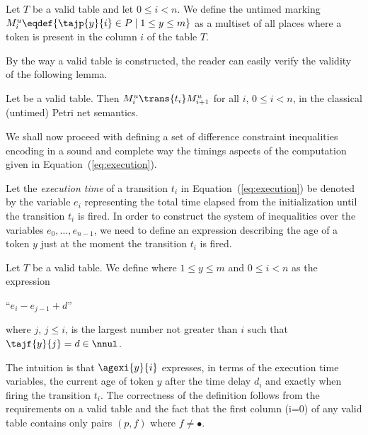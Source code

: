 \begin{definition} \label{def:untmark}
Let $T$ be a valid table and let $0 \leq i < n$.
We define the untimed marking $M_i^u \eqdef \{ \tajp{y}{i} \in P \mid
1 \leq y \leq m  \}$  as a multiset of all places where a token is present
in the column $i$ of the table $T$.
\end{definition}

By the way a valid table is constructed, the reader can easily verify
the validity of the following lemma.
\begin{lemma}\label{lemma:untmarking}
Let  be a valid table.
Then $M^u_i \trans{t_i} M^{u}_{i+1}$ for all $i$, $0 \leq i < n$,
in the classical (untimed) Petri net semantics.
\end{lemma}

We shall now proceed with defining a set of difference constraint 
inequalities encoding in a sound and complete way 
the timings aspects of the computation given in Equation~(\ref{eq:execution}).

Let the \emph{execution time} of a transition $t_i$
in Equation~(\ref{eq:execution}) be denoted by the variable $e_i$
representing the total time elapsed from the 
initialization until the transition $t_{i}$ is fired. 
In order to construct the system of inequalities over the variables
$e_0, \ldots, e_{n-1}$, we need to define an expression describing
the age of a token $y$ just at the moment the transition $t_i$ is fired.

\begin{definition}\label{def:age}
Let $T$ be a valid table.
We define  where $1 \leq y \leq m$ and $0 \leq i < n$
as the expression 
\begin{center}
``$e_i -e_{j-1} +d$'' 
\end{center}
where $j$, $j\leq i$,
is the largest number not greater than $i$
such that $\tajf{y}{j}=d\in \nnul$. 
\end{definition}

The intuition is that $\agexi{y}{i}$ expresses, in terms of
the execution time variables, the current age
of token $y$ after the time delay $d_i$ and exactly when 
firing the transition $t_i$.
The correctness of the definition follows from the
requirements on a valid table and the fact that the first column (i=0) of 
any valid table contains only pairs $(p,f)$ where $f \not= \bullet$.

